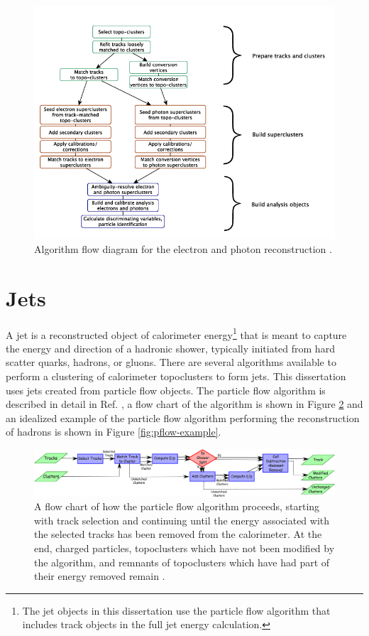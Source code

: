 		\begin{figure}[!ht]
		\centering
		\includegraphics[width=.65\textwidth,keepaspectratio=true]{chapters/chapter5_eventreconnstruction/images/egamma_flow_01.png}
		\caption{\label{fig:egamma-reco} Algorithm flow diagram for the electron and photon reconstruction \cite{electron-perf}.}
		\end{figure}

	\section{Jets}\label{sec:reco-jets}
		A jet is a reconstructed object of calorimeter energy\footnote{The jet objects in this dissertation use the particle flow algorithm that includes track objects in the full jet energy calculation.} that is meant to capture the energy and direction of a hadronic shower, typically initiated from hard scatter quarks, hadrons, or gluons. There are several algorithms available to perform a clustering of calorimeter topoclusters to form jets. This dissertation uses jets created from particle flow objects. The particle flow algorithm is described in detail in Ref. \cite{pflow}, a flow chart of the algorithm is shown in Figure \ref{fig:pflow-flowchart} and an idealized example of the particle flow algorithm performing the reconstruction of hadrons is shown in Figure \ref{fig:pflow-example}. 

		\begin{figure}[!ht]
		\centering
		\includegraphics[width=\textwidth,keepaspectratio=true]{chapters/chapter5_eventreconnstruction/images/pflow_flow_chart.png}
		\caption{\label{fig:pflow-flowchart} A flow chart of how the particle flow algorithm proceeds, starting with track selection and continuing until the energy associated with the selected tracks has been removed from the calorimeter. At the end, charged particles, topoclusters which have not been modified by the algorithm, and remnants of topoclusters which have had part of their energy removed remain \cite{pflow}.}
		\end{figure}

